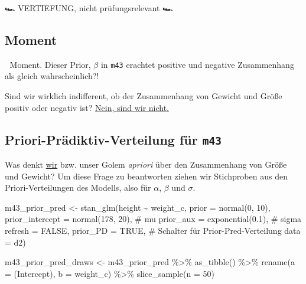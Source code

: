 \documentclass[
  a4paper,
  DIV=11]{scrreprt}
\newenvironment{Shaded}{\begin{snugshade}}{\end{snugshade}}
\newcommand{\AttributeTok}[1]{\textcolor[rgb]{0.40,0.45,0.13}{#1}}
\newcommand{\CommentTok}[1]{\textcolor[rgb]{0.37,0.37,0.37}{#1}}
\newcommand{\ConstantTok}[1]{\textcolor[rgb]{0.56,0.35,0.01}{#1}}
\newcommand{\DecValTok}[1]{\textcolor[rgb]{0.68,0.00,0.00}{#1}}
\newcommand{\FloatTok}[1]{\textcolor[rgb]{0.68,0.00,0.00}{#1}}
\newcommand{\FunctionTok}[1]{\textcolor[rgb]{0.28,0.35,0.67}{#1}}
\newcommand{\NormalTok}[1]{\textcolor[rgb]{0.00,0.23,0.31}{#1}}
\newcommand{\OtherTok}[1]{\textcolor[rgb]{0.00,0.23,0.31}{#1}}
\newcommand{\SpecialCharTok}[1]{\textcolor[rgb]{0.37,0.37,0.37}{#1}}
\newcommand{\StringTok}[1]{\textcolor[rgb]{0.13,0.47,0.30}{#1}}
\theoremstyle{definition}
\theoremstyle{remark}
\begin{document}
🏎️ VERTIEFUNG, nicht prüfungsrelevant 🏎️

\hypertarget{moment}{%
\subsection{Moment}\label{moment}}

🤔 Moment. Dieser Prior, \(\beta\) in \texttt{m43} erachtet positive und
negative Zusammenhang als gleich wahrscheinlich?!

Sind wir wirklich indifferent, ob der Zusammenhang von Gewicht und Größe
positiv oder negativ ist?
\href{https://media.giphy.com/media/daPCSjwus6UR2JxRX1/giphy.gif}{Nein,
sind wir nicht.}

\hypertarget{priori-pruxe4diktiv-verteilung-fuxfcr-m43}{%
\subsection{\texorpdfstring{Priori-Prädiktiv-Verteilung für
\texttt{m43}}{Priori-Prädiktiv-Verteilung für m43}}\label{priori-pruxe4diktiv-verteilung-fuxfcr-m43}}

Was denkt
\href{https://media.giphy.com/media/Aausss8uUBIe3bZ3d2/giphy.gif}{wir}
bzw. unser Golem \emph{apriori} über den Zusammenhang von Größe und
Gewicht? Um diese Frage zu beantworten ziehen wir Stichproben aus den
Priori-Verteilungen des Modells, also für \(\alpha\), \(\beta\) und
\(\sigma\).

\begin{Shaded}
\begin{Highlighting}[]
\NormalTok{m43\_prior\_pred }\OtherTok{\textless{}{-}}
    \FunctionTok{stan\_glm}\NormalTok{(height }\SpecialCharTok{\textasciitilde{}}\NormalTok{ weight\_c, }
             \AttributeTok{prior =} \FunctionTok{normal}\NormalTok{(}\DecValTok{0}\NormalTok{, }\DecValTok{10}\NormalTok{),}
             \AttributeTok{prior\_intercept =} \FunctionTok{normal}\NormalTok{(}\DecValTok{178}\NormalTok{, }\DecValTok{20}\NormalTok{),  }\CommentTok{\# mu}
             \AttributeTok{prior\_aux =} \FunctionTok{exponential}\NormalTok{(}\FloatTok{0.1}\NormalTok{),  }\CommentTok{\# sigma}
             \AttributeTok{refresh =} \ConstantTok{FALSE}\NormalTok{, }
             \AttributeTok{prior\_PD =} \ConstantTok{TRUE}\NormalTok{,  }\CommentTok{\# Schalter für Prior{-}Pred{-}Verteilung}
             \AttributeTok{data =}\NormalTok{ d2)}


\NormalTok{m43\_prior\_pred\_draws }\OtherTok{\textless{}{-}} 
\NormalTok{  m43\_prior\_pred }\SpecialCharTok{\%\textgreater{}\%} 
  \FunctionTok{as\_tibble}\NormalTok{() }\SpecialCharTok{\%\textgreater{}\%} 
  \FunctionTok{rename}\NormalTok{(}\AttributeTok{a =} \StringTok{\textasciigrave{}}\AttributeTok{(Intercept)}\StringTok{\textasciigrave{}}\NormalTok{,}
         \AttributeTok{b =}\NormalTok{ weight\_c) }\SpecialCharTok{\%\textgreater{}\%} 
  \FunctionTok{slice\_sample}\NormalTok{(}\AttributeTok{n =} \DecValTok{50}\NormalTok{)}
\end{Highlighting}
\end{Shaded}
\end{document}
